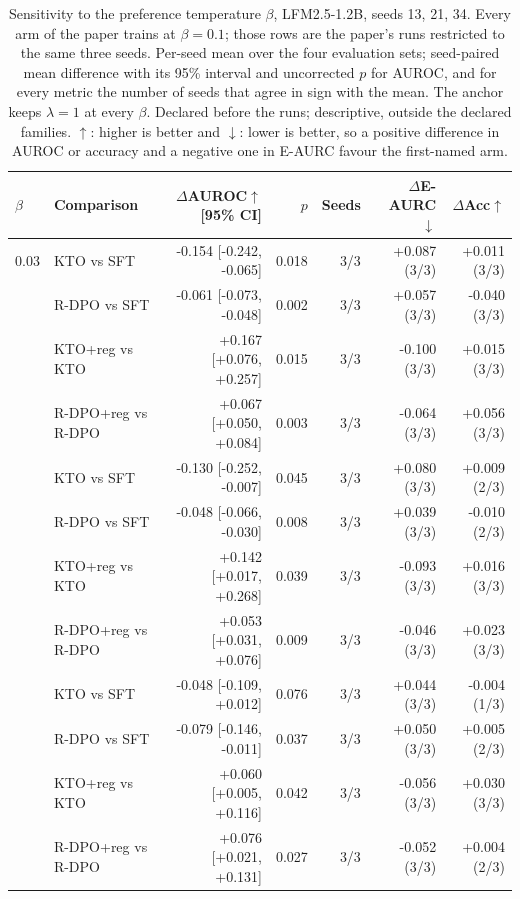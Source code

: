 \begin{table}[t]
\centering
\caption{Sensitivity to the preference temperature $\beta$, LFM2.5-1.2B, seeds 13, 21, 34. Every arm of the paper trains at $\beta = 0.1$; those rows are the paper's runs restricted to the same three seeds. Per-seed mean over the four evaluation sets; seed-paired mean difference with its 95\% interval and uncorrected $p$ for AUROC, and for every metric the number of seeds that agree in sign with the mean. The anchor keeps $\lambda = 1$ at every $\beta$. Declared before the runs; descriptive, outside the declared families. $\uparrow$: higher is better and $\downarrow$: lower is better, so a positive difference in AUROC or accuracy and a negative one in E-AURC favour the first-named arm.}
\label{tab:beta}
\footnotesize
\setlength{\tabcolsep}{3pt}
\begin{tabular}{llrrrrr}
\toprule
$\beta$ & Comparison & $\Delta$AUROC$\uparrow$ [95\% CI] & $p$ & Seeds & $\Delta$E-AURC$\downarrow$ & $\Delta$Acc$\uparrow$ \\
\midrule
0.03 & KTO vs SFT & -0.154 [-0.242, -0.065] & 0.018 & 3/3 & +0.087 (3/3) & +0.011 (3/3) \\
 & R-DPO vs SFT & -0.061 [-0.073, -0.048] & 0.002 & 3/3 & +0.057 (3/3) & -0.040 (3/3) \\
 & KTO+reg vs KTO & +0.167 [+0.076, +0.257] & 0.015 & 3/3 & -0.100 (3/3) & +0.015 (3/3) \\
 & R-DPO+reg vs R-DPO & +0.067 [+0.050, +0.084] & 0.003 & 3/3 & -0.064 (3/3) & +0.056 (3/3) \\
\addlinespace
0.1 & KTO vs SFT & -0.130 [-0.252, -0.007] & 0.045 & 3/3 & +0.080 (3/3) & +0.009 (2/3) \\
 & R-DPO vs SFT & -0.048 [-0.066, -0.030] & 0.008 & 3/3 & +0.039 (3/3) & -0.010 (2/3) \\
 & KTO+reg vs KTO & +0.142 [+0.017, +0.268] & 0.039 & 3/3 & -0.093 (3/3) & +0.016 (3/3) \\
 & R-DPO+reg vs R-DPO & +0.053 [+0.031, +0.076] & 0.009 & 3/3 & -0.046 (3/3) & +0.023 (3/3) \\
\addlinespace
0.3 & KTO vs SFT & -0.048 [-0.109, +0.012] & 0.076 & 3/3 & +0.044 (3/3) & -0.004 (1/3) \\
 & R-DPO vs SFT & -0.079 [-0.146, -0.011] & 0.037 & 3/3 & +0.050 (3/3) & +0.005 (2/3) \\
 & KTO+reg vs KTO & +0.060 [+0.005, +0.116] & 0.042 & 3/3 & -0.056 (3/3) & +0.030 (3/3) \\
 & R-DPO+reg vs R-DPO & +0.076 [+0.021, +0.131] & 0.027 & 3/3 & -0.052 (3/3) & +0.004 (2/3) \\
\bottomrule
\end{tabular}
\end{table}
